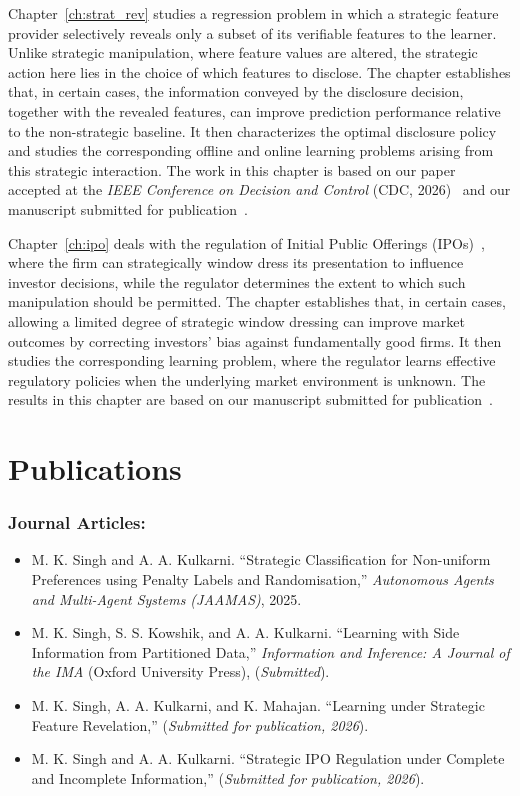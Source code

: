 Chapter~\ref{ch:strat_rev} studies a regression problem in which a strategic feature provider selectively reveals only a subset of its verifiable features to the learner. Unlike strategic manipulation, where feature values are altered, the strategic action here lies in the choice of which features to disclose. The chapter establishes that, in certain cases, the information conveyed by the disclosure decision, together with the revealed features, can improve prediction performance relative to the non-strategic baseline. It then characterizes the optimal disclosure policy and studies the corresponding offline and online learning problems arising from this strategic interaction. The work in this chapter is based on our paper accepted at the \emph{IEEE Conference on Decision and Control} (CDC, 2026)~\cite{singh2026linear} and our manuscript submitted for publication~\cite{singh2026revelation_journal}.

Chapter~\ref{ch:ipo} deals with the regulation of Initial Public Offerings (IPOs)~\cite{ritter2003investment}, where the firm can strategically window dress its presentation to influence investor decisions, while the regulator determines the extent to which such manipulation should be permitted. The chapter establishes that, in certain cases, allowing a limited degree of strategic window dressing can improve market outcomes by correcting investors' bias against fundamentally good firms. It then studies the corresponding learning problem, where the regulator learns effective regulatory policies when the underlying market environment is unknown. The results in this chapter are based on our manuscript submitted for publication~\cite{singh2026ipo_journal}.

\clearpage
\section*{Publications}
\label{sec:publications}

\subsubsection*{Journal Articles:}
\begin{itemize}[leftmargin=*,noitemsep,topsep=2pt]
\item[\(1.\)] M. K. Singh and A. A. Kulkarni. ``Strategic Classification for Non-uniform Preferences using Penalty Labels and Randomisation,'' \emph{Autonomous Agents and Multi-Agent Systems (JAAMAS)}, 2025.
\item[\(2.\)] M. K. Singh, S. S. Kowshik, and A. A. Kulkarni. ``Learning with Side Information from Partitioned Data,'' \emph{Information and Inference: A Journal of the IMA} (Oxford University Press), (\emph{Submitted}).
\item[\(3.\)] M. K. Singh, A. A. Kulkarni, and K. Mahajan. ``Learning under Strategic Feature Revelation,'' (\emph{Submitted for publication, 2026}).
\item[\(4.\)] M. K. Singh and A. A. Kulkarni. ``Strategic IPO Regulation under Complete and Incomplete Information,'' (\emph{Submitted for publication, 2026}).
\end{itemize}

